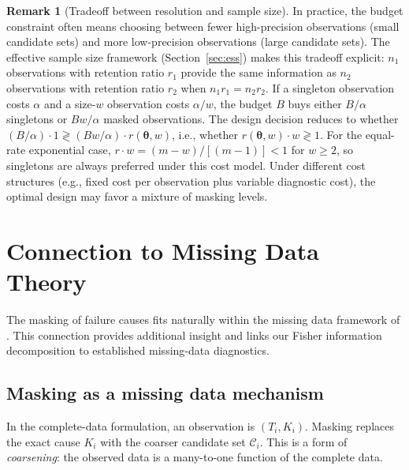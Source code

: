 \documentclass[11pt]{article}
\theoremstyle{definition}
\newtheorem{remark}{Remark}
\theoremstyle{plain}
\renewcommand{\v}[1]{\boldsymbol{#1}}
\newcommand{\btheta}{\v{\theta}}
\begin{document}
\begin{remark}[Tradeoff between resolution and sample size]
\label{rem:design-tradeoff}
In practice, the budget constraint often means choosing between
fewer high-precision observations (small candidate sets) and more
low-precision observations (large candidate sets).
The effective sample size framework
(Section~\ref{sec:ess}) makes this tradeoff explicit:
$n_1$ observations with retention ratio $r_1$ provide the same
information as $n_2$ observations with retention ratio $r_2$ when
$n_1 r_1 = n_2 r_2$.
If a singleton observation costs $\alpha$ and a size-$w$ observation
costs $\alpha/w$, the budget $B$ buys either $B/\alpha$ singletons
or $Bw/\alpha$ masked observations.
The design decision reduces to whether
$(B/\alpha) \cdot 1 \gtrless (Bw/\alpha) \cdot r(\btheta, w)$,
i.e., whether $r(\btheta, w) \cdot w \gtrless 1$.
For the equal-rate exponential case,
$r \cdot w = (m - w)/[(m-1)] < 1$ for $w \geq 2$, so singletons
are always preferred under this cost model.
Under different cost structures (e.g., fixed cost per observation
plus variable diagnostic cost), the optimal design may favor a
mixture of masking levels.
\end{remark}


\section{Connection to Missing Data Theory}
\label{sec:missing-data}

The masking of failure causes fits naturally within the missing data
framework of \citet{little2002}.
This connection provides additional insight and links our Fisher
information decomposition to established missing-data diagnostics.

\subsection{Masking as a missing data mechanism}

In the complete-data formulation, an observation is $(T_i, K_i)$.
Masking replaces the exact cause $K_i$ with the coarser candidate
set $\mathcal{C}_i$.
This is a form of \emph{coarsening}: the observed data is a
many-to-one function of the complete data.
\end{document}
